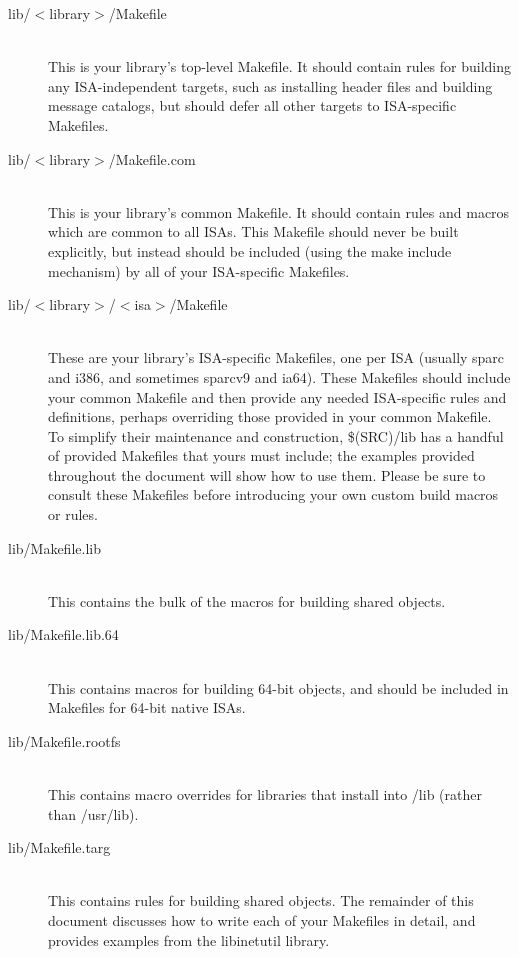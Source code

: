 \documentclass{article}
\begin{document}
\begin{description}

\item[lib/$<$library$>$/Makefile] \hfill \\
  This is your library's top-level Makefile. It should contain rules for building
  any ISA-independent targets, such as installing header files and building
  message catalogs, but should defer all other targets to ISA-specific Makefiles.

\item[lib/$<$library$>$/Makefile.com] \hfill \\
  This is your library's common Makefile. It should contain rules and macros
  which are common to all ISAs. This Makefile should never be built explicitly,
  but instead should be included (using the make include mechanism) by all of
  your ISA-specific Makefiles.

\item[lib/$<$library$>$/$<$isa$>$/Makefile] \hfill \\
  These are your library's ISA-specific Makefiles, one per ISA (usually sparc and
  i386, and sometimes sparcv9 and ia64). These Makefiles should include your
  common Makefile and then provide any needed ISA-specific rules and definitions,
  perhaps overriding those provided in your common Makefile. To simplify their
  maintenance and construction, \$(SRC)/lib has a handful of provided Makefiles
  that yours must include; the examples provided throughout the document will
  show how to use them. Please be sure to consult these Makefiles before
  introducing your own custom build macros or rules.

\item[lib/Makefile.lib] \hfill \\
  This contains the bulk of the macros for building shared objects.

\item[lib/Makefile.lib.64] \hfill \\
  This contains macros for building 64-bit objects, and should be included in
  Makefiles for 64-bit native ISAs.

\item[lib/Makefile.rootfs] \hfill \\
  This contains macro overrides for libraries that install into /lib (rather than
  /usr/lib).

\item[lib/Makefile.targ] \hfill \\
  This contains rules for building shared objects. The remainder of this document
  discusses how to write each of your Makefiles in detail, and provides examples
  from the libinetutil library.

\end{description}
\end{document}
